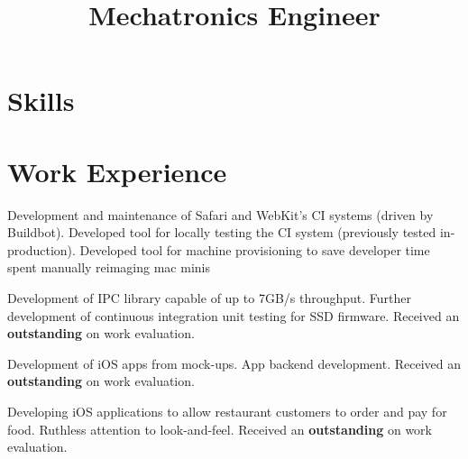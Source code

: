 \documentclass[11pt,a4paper]{moderncv}
\title{Mechatronics Engineer}               %
\begin{document}
\maketitle

\vspace{-13mm}

\section{Skills}


\section{Work Experience}
{Development and maintenance of Safari and WebKit's CI systems (driven by Buildbot).
    \newline{}Developed tool for locally testing the CI system (previously tested in-production).
\newline{}Developed tool for machine provisioning to save developer time spent manually reimaging mac minis}

{Development of IPC library capable of up to 7GB/s throughput.
    \newline{}Further development of continuous integration unit testing for SSD firmware.
\newline{}Received an \textbf{outstanding} on work evaluation.}

{Development of iOS apps from mock-ups.
\newline{}App backend development.
\newline{}Received an \textbf{outstanding} on work evaluation.}

{Developing iOS applications to allow restaurant customers to order and pay for food.
\newline{} Ruthless attention to look-and-feel.
\newline{}Received an \textbf{outstanding} on work evaluation.}
\end{document}
